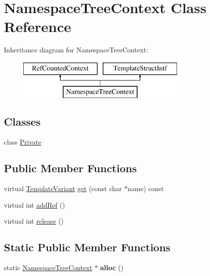 \hypertarget{class_namespace_tree_context}{}\section{Namespace\+Tree\+Context Class Reference}
\label{class_namespace_tree_context}
Inheritance diagram for Namespace\+Tree\+Context\+:\begin{figure}[H]
\begin{center}
\leavevmode
\includegraphics[height=2.000000cm]{class_namespace_tree_context}
\end{center}
\end{figure}
\subsection*{Classes}
\begin{DoxyCompactItemize}
\item 
class \mbox{\hyperlink{class_namespace_tree_context_1_1_private}{Private}}
\end{DoxyCompactItemize}
\subsection*{Public Member Functions}
\begin{DoxyCompactItemize}
\item 
virtual \mbox{\hyperlink{class_template_variant}{Template\+Variant}} \mbox{\hyperlink{class_namespace_tree_context_a641364597e056407e75705f4d4693540}{get}} (const char $\ast$name) const
\item 
virtual int \mbox{\hyperlink{class_namespace_tree_context_a2f77e1fafbf8e6e4245aade3fed316b8}{add\+Ref}} ()
\item 
virtual int \mbox{\hyperlink{class_namespace_tree_context_aa867e3f0d1ad5b49d6b0c72528f54c2e}{release}} ()
\end{DoxyCompactItemize}
\subsection*{Static Public Member Functions}
\begin{DoxyCompactItemize}
\item 
\mbox{\label{class_namespace_tree_context_ae910c89edd00342a3ce328f98d8a63ec}} 
static \mbox{\hyperlink{class_namespace_tree_context}{Namespace\+Tree\+Context}} $\ast$ {\bfseries alloc} ()
\end{DoxyCompactItemize}


